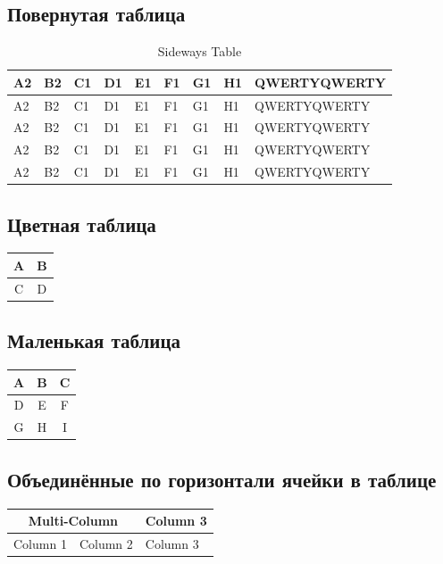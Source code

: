 \documentclass{article}
\begin{document}
\subsection{Повернутая таблица}
\begin{table}
\centering
\caption{Sideways Table}
\begin{tabular}{|l|l|l|l|l|l|l|l|l| }
\hline
A2 & B2 & C1 & D1 & E1 & F1 & G1 & H1 & QWERTYQWERTY \\
\hline
A2 & B2 & C1 & D1 & E1 & F1 & G1 & H1 & QWERTYQWERTY \\
\hline
A2 & B2 & C1 & D1 & E1 & F1 & G1 & H1 & QWERTYQWERTY \\
\hline
A2 & B2 & C1 & D1 & E1 & F1 & G1 & H1 & QWERTYQWERTY \\
\hline
A2 & B2 & C1 & D1 & E1 & F1 & G1 & H1 & QWERTYQWERTY \\
\hline
\end{tabular}
\end{table}
\clearpage

\subsection{Цветная таблица}
\begin{tabular}{|c|c|}
    \hline
    \cellcolor{purple!30}A & \cellcolor{pink!60}B \\
    \hline
    \cellcolor{red!40}C & \cellcolor{orange!50}D \\
    \hline
\end{tabular}

\subsection{Маленькая таблица}
\setlength{\arrayrulewidth}{1.5pt}
\begin{tabular}{|c|c|c|}
    \hline
    A & B & C \\
    \hline
    D & E & F \\
    \hline
    G & H & I \\
    \hline
\end{tabular}

\subsection{Объединённые по горизонтали ячейки в таблице}
\begin{tabular}{|l|l|l|}
    \hline
    \multicolumn{2}{|c|}{Multi-Column} & Column 3 \\
    \hline
    Column 1 & Column 2 & Column 3 \\
    \hline
\end{tabular}
\end{document}
